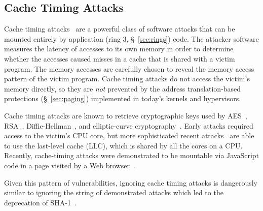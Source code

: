 \subsection{Cache Timing Attacks}
\label{sec:cache_timing}


Cache timing attacks~\cite{banescu2011cache} are a powerful class of software
attacks that can be mounted entirely by application
(ring 3, \S~\ref{sec:rings}) code. The attacker software measures the latency
of accesses to its own memory in order to determine whether the accesses caused
misses in a cache that is shared with a victim program. The memory accesses are
carefully chosen to reveal the memory access pattern of the victim program.
Cache timing attacks do not access the victim's memory directly, so they are
\emph{not} prevented by the address translation-based protections
(\S~\ref{sec:paging}) implemented in today's kernels and hypervisors.

Cache timing attacks are known to retrieve cryptographic keys used by
AES~\cite{bonneau2006aes}, RSA~\cite{brumley2005rsa},
Diffie-Hellman~\cite{kocher1996timing}, and elliptic-curve
cryptography~\cite{brumley2011ecc}.
Early attacks required access to the victim's CPU core, but more sophisticated
recent attacks~\cite{yarom2013llctiming, liu2015llctiming} are able to use the
last-level cache (LLC), which is shared by all the cores on a CPU. Recently,
cache-timing attacks were demonstrated to be mountable via JavaScript code in a
page visited by a Web browser~\cite{oren2015jstiming}.

Given this pattern of vulnerabilities, ignoring cache timing attacks is
dangerously similar to ignoring the string of demonstrated attacks which led to
the deprecation of SHA-1~\cite{nist2014sha1policy, google2014sha1deprecation,
microsoft2014sha1deprecation}.
